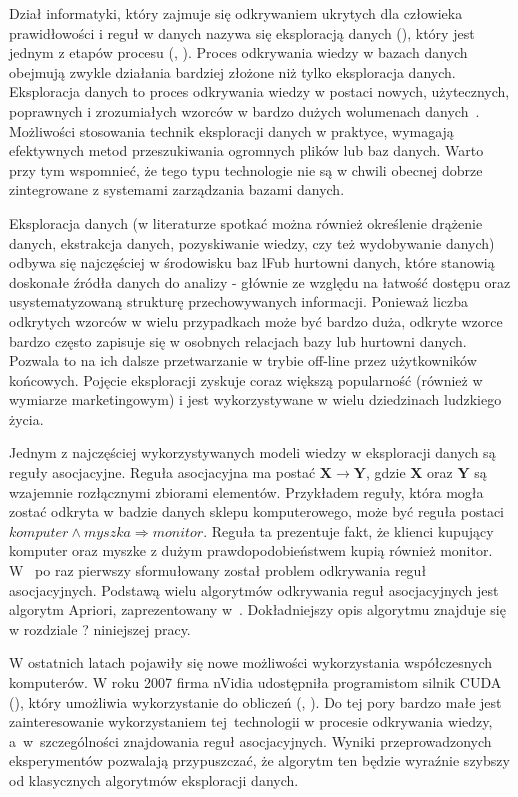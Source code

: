 Dział informatyki, który zajmuje się odkrywaniem ukrytych dla człowieka prawidłowości i reguł w danych nazywa się eksploracją danych (), który jest jednym z etapów procesu  (, ). Proces odkrywania wiedzy w bazach danych obejmują zwykle działania bardziej złożone niż tylko eksploracja danych. Eksploracja danych to proces odkrywania wiedzy w postaci nowych, użytecznych, poprawnych i zrozumiałych wzorców w bardzo dużych wolumenach danych~\cite{DataMiningStart}. Możliwości stosowania technik eksploracji danych w praktyce, wymagają efektywnych metod przeszukiwania ogromnych plików lub baz danych. Warto przy tym wspomnieć, że tego typu technologie nie są w chwili obecnej dobrze zintegrowane z systemami zarządzania bazami danych.

Eksploracja danych (w literaturze spotkać można również określenie drążenie danych, ekstrakcja danych, pozyskiwanie wiedzy, czy też wydobywanie danych) odbywa się najczęściej w środowisku baz lFub hurtowni danych, które stanowią doskonałe źródła danych do analizy - głównie ze względu na łatwość dostępu oraz usystematyzowaną strukturę przechowywanych informacji. Ponieważ liczba odkrytych wzorców w wielu przypadkach może być bardzo duża, odkryte wzorce bardzo często zapisuje się w osobnych relacjach bazy lub hurtowni danych. Pozwala to na ich dalsze przetwarzanie w trybie off-line przez użytkowników końcowych. Pojęcie eksploracji zyskuje coraz większą popularność (również w wymiarze marketingowym) i jest wykorzystywane w wielu dziedzinach ludzkiego życia.

Jednym z najczęściej wykorzystywanych modeli wiedzy w eksploracji danych są reguły asocjacyjne. Reguła asocjacyjna ma postać $\mathbf{X} \to \mathbf{Y}$, gdzie $\mathbf{X}$ oraz $\mathbf{Y}$ są wzajemnie rozłącznymi zbiorami elementów. Przykładem reguły, która mogła zostać odkryta w badzie danych sklepu komputerowego, może być reguła postaci $komputer \land myszka \Rightarrow monitor$. Reguła ta prezentuje fakt, że klienci kupujący komputer oraz myszke z dużym prawdopodobieństwem kupią również monitor. W~\cite{AssRulesStrt} po raz pierwszy sformułowany został problem odkrywania reguł asocjacyjnych. Podstawą wielu algorytmów odkrywania reguł asocjacyjnych jest algorytm Apriori, zaprezentowany w~\cite{Problem:Statement}. Dokładniejszy opis algorytmu znajduje się w rozdziale ? niniejszej pracy.

W ostatnich latach pojawiły się nowe możliwości wykorzystania współczesnych komputerów. W roku 2007 firma nVidia udostępniła programistom silnik CUDA (), który umożliwia wykorzystanie do obliczeń  (, ). Do tej pory bardzo małe jest zainteresowanie wykorzystaniem tej~technologii w procesie odkrywania wiedzy, a~w~szczególności znajdowania reguł asocjacyjnych. Wyniki przeprowadzonych eksperymentów pozwalają przypuszczać, że algorytm ten będzie wyraźnie szybszy od klasycznych algorytmów eksploracji danych.

